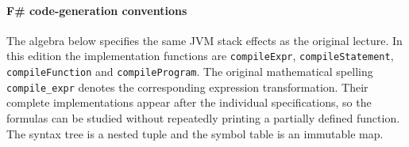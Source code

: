 \paragraph{F\# code-generation conventions} The algebra below specifies the same JVM stack effects as the original lecture.
In this edition the implementation functions are \texttt{compileExpr}, \texttt{compileStatement}, \texttt{compileFunction} and \texttt{compileProgram}.
The original mathematical spelling \texttt{compile\_expr} denotes the corresponding expression transformation.
Their complete implementations appear after the individual specifications, so the formulas can be studied without repeatedly printing a partially defined function.
The syntax tree is a nested tuple and the symbol table is an immutable map.
